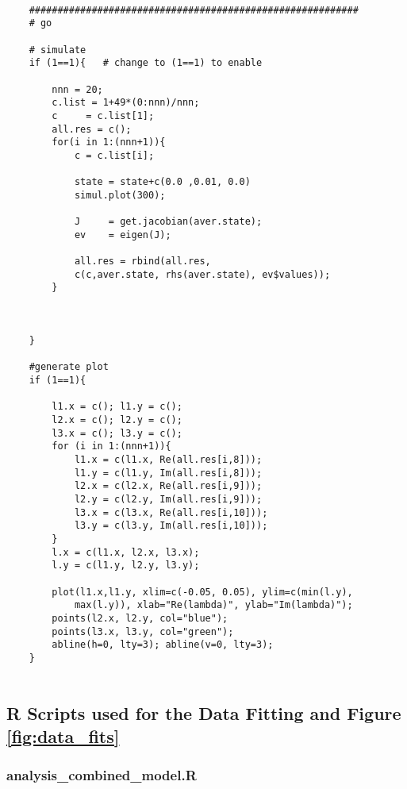 \begin{lstlisting}
		
	##########################################################
	# go
		
	# simulate 	
	if (1==1){   # change to (1==1) to enable
		
		nnn = 20;
		c.list = 1+49*(0:nnn)/nnn;
		c     = c.list[1];
		all.res = c();
		for(i in 1:(nnn+1)){
			c = c.list[i];
			
			state = state+c(0.0 ,0.01, 0.0)
			simul.plot(300); 
				
			J     = get.jacobian(aver.state);
			ev    = eigen(J);
			
			all.res = rbind(all.res, 
			c(c,aver.state, rhs(aver.state), ev$values));
		}
			
		
			
	}
		
	#generate plot	
	if (1==1){
		
		l1.x = c(); l1.y = c();
		l2.x = c(); l2.y = c();
		l3.x = c(); l3.y = c();
		for (i in 1:(nnn+1)){
			l1.x = c(l1.x, Re(all.res[i,8]));  
			l1.y = c(l1.y, Im(all.res[i,8]));
			l2.x = c(l2.x, Re(all.res[i,9]));  
			l2.y = c(l2.y, Im(all.res[i,9]));
			l3.x = c(l3.x, Re(all.res[i,10])); 
			l3.y = c(l3.y, Im(all.res[i,10]));
		}
		l.x = c(l1.x, l2.x, l3.x);
		l.y = c(l1.y, l2.y, l3.y);
			
		plot(l1.x,l1.y, xlim=c(-0.05, 0.05), ylim=c(min(l.y), 
			max(l.y)), xlab="Re(lambda)", ylab="Im(lambda)");
		points(l2.x, l2.y, col="blue");
		points(l3.x, l3.y, col="green");
		abline(h=0, lty=3); abline(v=0, lty=3);
	}
		
	\end{lstlisting}
	
	\newpage
	
	\subsection{R Scripts used for the Data Fitting and Figure \ref{fig:data_fits}}\label{app:second}
	
	\subsubsection{analysis\_combined\_model.R}
	
